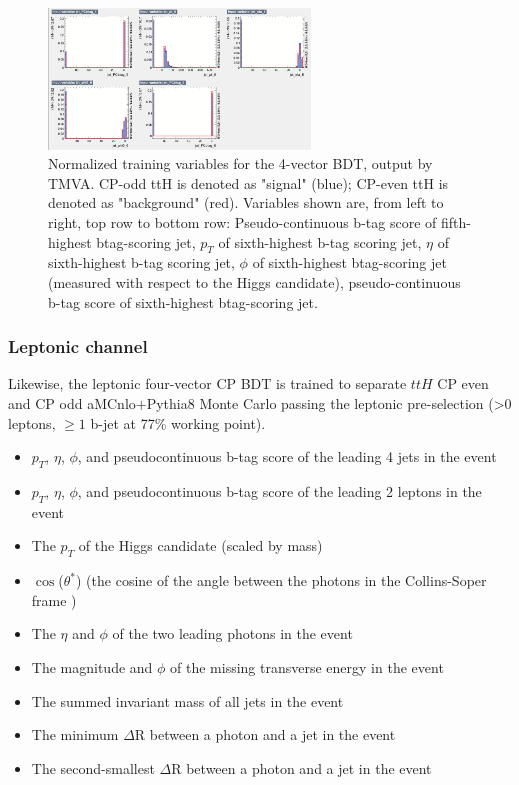\begin{figure}[htbp]
  \centering
  	\includegraphics[width=0.62\textwidth]{figures/TMVABDTStudies/had-vbls4vec/had4vecvbls6.png}
  \caption{Normalized training variables for the 4-vector BDT, output by TMVA. CP-odd ttH is denoted as "signal" (blue); CP-even ttH is denoted as "background" (red). Variables shown are, from left to right, top row to bottom row: Pseudo-continuous b-tag score of fifth-highest btag-scoring jet, $p_{T}$ of sixth-highest b-tag scoring jet, $\eta$ of sixth-highest b-tag scoring jet, $\phi$ of sixth-highest btag-scoring jet (measured with respect to the Higgs candidate), pseudo-continuous b-tag score of sixth-highest btag-scoring jet.}
  \label{fig:had4vecvbls6}
  
\end{figure}

\clearpage

\subsubsection{Leptonic channel}

Likewise, the leptonic  four-vector CP BDT is trained to separate $ttH$ CP even and CP odd aMCnlo+Pythia8 Monte Carlo passing the leptonic pre-selection (>0 leptons, $\ge1$ b-jet at 77\% working point).

\begin{itemize}
\item $p_{T}$, $\eta$, $\phi$, and pseudocontinuous b-tag score of the leading 4 jets in the event
\item $p_{T}$, $\eta$, $\phi$, and pseudocontinuous b-tag score of the leading 2 leptons in the event
\item The $p_{T}$ of the Higgs candidate (scaled by mass)
\item  $\cos$($\theta^{*}$) (the cosine of the angle between the photons in the Collins-Soper frame \cite{thetastar})
\item The $\eta$ and $\phi$ of the two leading photons in the event
\item The magnitude and $\phi$ of the missing transverse energy in the event
\item The summed invariant mass of all jets in the event
\item The minimum $\Delta$R between a photon and a jet in the event
\item The second-smallest $\Delta$R between a photon and a jet in the event
\end{itemize} 


